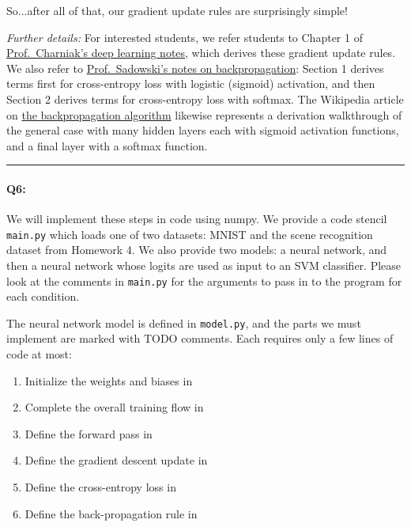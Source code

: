 So...after all of that, our gradient update rules are surprisingly simple!

\emph{Further details:} For interested students, we refer students to Chapter 1 of \href{https://cs.brown.edu/courses/csci1460/assets/files/deep-learning.pdf}{Prof.~Charniak's deep learning notes}, which derives these gradient update rules. We also refer to \href{http://web.khu.ac.kr/~tskim/MLPR\%2025-3\%20Backpropagation%20with%20CE%20(Handout).pdf}{Prof.~Sadowski's notes on backpropagation}: Section 1 derives terms first for cross-entropy loss with logistic (sigmoid) activation, and then Section 2 derives terms for cross-entropy loss with softmax. The Wikipedia article on \href{https://en.wikipedia.org/wiki/Backpropagation}{the backpropagation algorithm} likewise represents a derivation walkthrough of the general case with many hidden layers each with sigmoid activation functions, and a final layer with a softmax function.

\hspace{\fill}\rule{0.5\linewidth}{.5pt}\hspace{\fill}


\paragraph{Q6:} We will implement these steps in code using numpy. We provide a code stencil \texttt{main.py} which loads one of two datasets: MNIST and the scene recognition dataset from Homework 4. We also provide two models: a neural network, and then a neural network whose logits are used as input to an SVM classifier. Please look at the comments in \texttt{main.py} for the arguments to pass in to the program for each condition. 

The neural network model is defined in \texttt{model.py}, and the parts we must implement are marked with TODO comments. Each requires only a few lines of code at most:
\begin{enumerate}
    \item Initialize the weights and biases in 
    \item Complete the overall training flow in 
    \item Define the forward pass in 
    \item Define the gradient descent update in 
    \item Define the cross-entropy loss in 
    \item Define the back-propagation rule in 
\end{enumerate}

